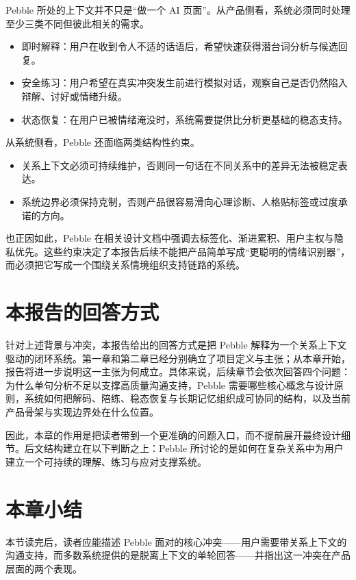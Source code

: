 Pebble 所处的上下文并不只是“做一个 AI 页面”。从产品侧看，系统必须同时处理至少三类不同但彼此相关的需求。

\begin{itemize}
  \item 即时解释：用户在收到令人不适的话语后，希望快速获得潜台词分析与候选回复。
  \item 安全练习：用户希望在真实冲突发生前进行模拟对话，观察自己是否仍然陷入辩解、讨好或情绪升级。
  \item 状态恢复：在用户已被情绪淹没时，系统需要提供比分析更基础的稳态支持。
\end{itemize}

从系统侧看，Pebble 还面临两类结构性约束。

\begin{itemize}
  \item 关系上下文必须可持续维护，否则同一句话在不同关系中的差异无法被稳定表达。
  \item 系统边界必须保持克制，否则产品很容易滑向心理诊断、人格贴标签或过度承诺的方向。
\end{itemize}

也正因如此，Pebble 在相关设计文档中强调去标签化、渐进累积、用户主权与隐私优先。这些约束决定了本报告后续不能把产品简单写成“更聪明的情绪识别器”，而必须把它写成一个围绕关系情境组织支持链路的系统。

\section{本报告的回答方式}

针对上述背景与冲突，本报告给出的回答方式是把 Pebble 解释为一个关系上下文驱动的闭环系统。第一章和第二章已经分别确立了项目定义与主张；从本章开始，报告将进一步说明这一主张为何成立。具体来说，后续章节会依次回答四个问题：为什么单句分析不足以支撑高质量沟通支持，Pebble 需要哪些核心概念与设计原则，系统如何把解码、陪练、稳态恢复与长期记忆组织成可协同的结构，以及当前产品骨架与实现边界处在什么位置。

因此，本章的作用是把读者带到一个更准确的问题入口，而不提前展开最终设计细节。后文结构建立在以下判断之上：Pebble 所讨论的是如何在复杂关系中为用户建立一个可持续的理解、练习与应对支撑系统。

\section{本章小结}

本节读完后，读者应能描述 Pebble 面对的核心冲突——用户需要带关系上下文的沟通支持，而多数系统提供的是脱离上下文的单轮回答——并指出这一冲突在产品层面的两个表现。


